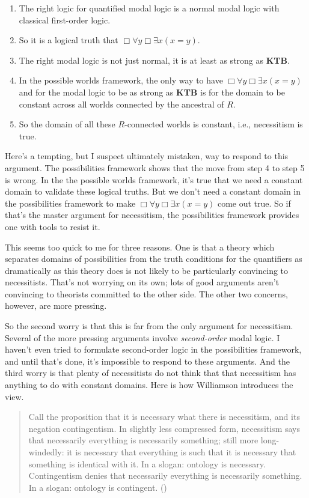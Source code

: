 \documentclass[
  11pt,
  letterpaper,
  DIV=11,
  numbers=noendperiod,
  twoside]{scrartcl}
\providecommand{\tightlist}{%
  \setlength{\itemsep}{0pt}\setlength{\parskip}{0pt}}
\begin{document}
\begin{enumerate}
\def\labelenumi{\arabic{enumi}.}
\tightlist
\item
  The right logic for quantified modal logic is a normal modal logic
  with classical first-order logic.
\item
  So it is a logical truth that
  \(\Box \forall y \Box  \exists x(x = y)\).
\item
  The right modal logic is not just normal, it is at least as strong as
  \textbf{KTB}.
\item
  In the possible worlds framework, the only way to have
  \(\Box \forall y \Box  \exists x(x = y)\) and for the modal logic to
  be as strong as \textbf{KTB} is for the domain to be constant across
  all worlds connected by the ancestral of \(R\).
\item
  So the domain of all these \(R\)-connected worlds is constant, i.e.,
  necessitism is true.
\end{enumerate}

Here's a tempting, but I suspect ultimately mistaken, way to respond to
this argument. The possibilities framework shows that the move from step
4 to step 5 is wrong. In the the possible worlds framework, it's true
that we need a constant domain to validate these logical truths. But we
don't need a constant domain in the possibilities framework to make
\(\Box \forall y \Box  \exists x(x = y)\) come out true. So if that's
the master argument for necessitism, the possibilities framework
provides one with tools to resist it.

This seems too quick to me for three reasons. One is that a theory which
separates domains of possibilities from the truth conditions for the
quantifiers as dramatically as this theory does is not likely to be
particularly convincing to necessitists. That's not worrying on its own;
lots of good arguments aren't convincing to theorists committed to the
other side. The other two concerns, however, are more pressing.

So the second worry is that this is far from the only argument for
necessitism. Several of the more pressing arguments involve
\emph{second-order} modal logic. I haven't even tried to formulate
second-order logic in the possibilities framework, and until that's
done, it's impossible to respond to these arguments. And the third worry
is that plenty of necessitists do not think that that necessitism has
anything to do with constant domains. Here is how Williamson introduces
the view.

\begin{quote}
Call the proposition that it is necessary what there is necessitism, and
its negation contingentism. In slightly less compressed form,
necessitism says that necessarily everything is necessarily something;
still more long-windedly: it is necessary that everything is such that
it is necessary that something is identical with it. In a slogan:
ontology is necessary. Contingentism denies that necessarily everything
is necessarily something. In a slogan: ontology is contingent.
()
\end{quote}
\end{document}

